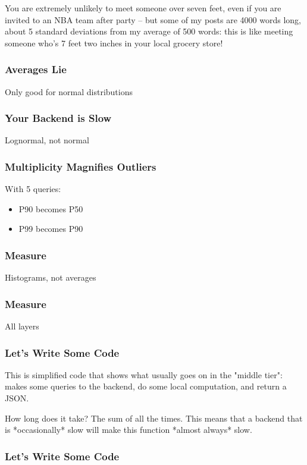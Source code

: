 You are extremely unlikely to meet someone over seven feet,
even if you are invited to an NBA team after party --
but some of my posts are 4000 words long,
about 5 standard deviations from my average of 500 words:
this is like meeting someone who's 7 feet two inches
in your local grocery store!

\begin{frame}
\frametitle{Averages Lie}

Only good for normal distributions

\end{frame}

\begin{frame}
\frametitle{Your Backend is Slow}

Lognormal, not normal

\end{frame}

\begin{frame}
\frametitle{Multiplicity Magnifies Outliers}

With 5 queries:

\begin{itemize}
\item P90 becomes P50
\item P99 becomes P90
\end{itemize}

\end{frame}

\begin{frame}
\frametitle{Measure}
Histograms, not averages
\end{frame}

\begin{frame}
\frametitle{Measure}
All layers
\end{frame}


\begin{frame}
\frametitle{Let's Write Some Code}



\end{frame}

This is simplified code that shows what usually goes on
in the "middle tier":
makes some queries to the backend,
do some local computation,
and return a JSON.

How long does it take?
The sum of all the times.
This means that a backend that is *occasionally* slow
will make this function *almost always* slow.

\begin{frame}
\frametitle{Let's Write Some Code}



\end{frame}

